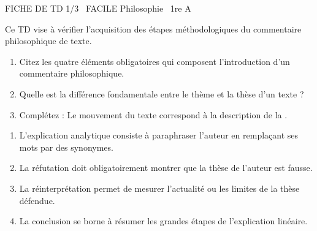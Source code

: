 \documentclass[11pt]{article}
\begin{document}
\begin{tcolorbox}[enhanced,colback=popink,colframe=popink,arc=10pt,boxrule=0pt,left=12pt,right=12pt,top=9pt,bottom=9pt]
{\color{white}\popxbold\small FICHE DE TD 1/3 \textbullet\ FACILE \hfill Philosophie \textbullet\ 1re A\par}
\end{tcolorbox}
\vspace{4pt}
Ce TD vise à vérifier l'acquisition des étapes méthodologiques du commentaire philosophique de texte.

\begin{exercice}
\begin{enumerate}
    \item Citez les quatre éléments obligatoires qui composent l'introduction d'un commentaire philosophique.
    \item Quelle est la différence fondamentale entre le \og thème \fg{} et la \og thèse \fg{} d'un texte ?
    \item Complétez : Le \og mouvement du texte \fg{} correspond à la description de la \underline{\hspace{4cm}}.
\end{enumerate}
\end{exercice}

\begin{exercice}
\begin{enumerate}
    \item L'explication analytique consiste à paraphraser l'auteur en remplaçant ses mots par des synonymes.
    \item La réfutation doit obligatoirement montrer que la thèse de l'auteur est fausse.
    \item La réinterprétation permet de mesurer l'actualité ou les limites de la thèse défendue.
    \item La conclusion se borne à résumer les grandes étapes de l'explication linéaire.
\end{enumerate}
\end{exercice}
\end{document}
